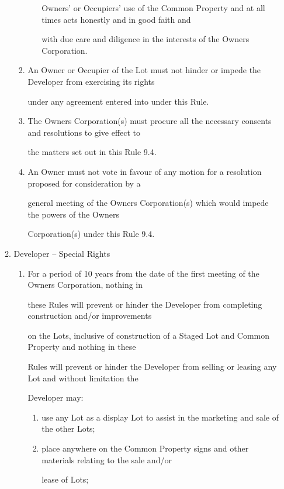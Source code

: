 \documentclass{article}
\begin{document}
\begin{enumerate}[label=\arabic*.]
\begin{enumerate}[label=\arabic{enumi}.\arabic*.]
\begin{enumerate}[label=(\arabic*)]
\begin{enumerate}[label=(\alph*)]
Owners' or Occupiers' use of the Common Property and at all times acts honestly and in good faith and 

with due care and diligence in the interests of the Owners Corporation. 

\end{enumerate}
\item  An Owner or Occupier of the Lot must not hinder or impede the Developer from exercising its rights 

under any agreement entered into under this Rule. 

\item  The Owners Corporation(s) must procure all the necessary consents and resolutions to give effect to 

the matters set out in this Rule 9.4. 

\item  An Owner must not vote in favour of any motion for a resolution proposed for consideration by a 

general meeting of the Owners Corporation(s) which would impede the powers of the Owners 

Corporation(s) under this Rule 9.4. 

\end{enumerate}
\item  Developer – Special Rights 

\begin{enumerate}[label=(\arabic*)]
\item  For a period of 10 years from the date of the first meeting of the Owners Corporation, nothing in 

these Rules will prevent or hinder the Developer from completing construction and/or improvements 

on the Lots, inclusive of construction of a Staged Lot and Common Property and nothing in these 

Rules will prevent or hinder the Developer from selling or leasing any Lot and without limitation the 

Developer may: 

\begin{enumerate}[label=(\alph*)]
\item  use any Lot as a display Lot to assist in the marketing and sale of the other Lots; 

\item  place anywhere on the Common Property signs and other materials relating to the sale and/or 

lease of Lots; 


\end{enumerate}
\end{enumerate}
\end{enumerate}
\end{enumerate}
\end{document}
